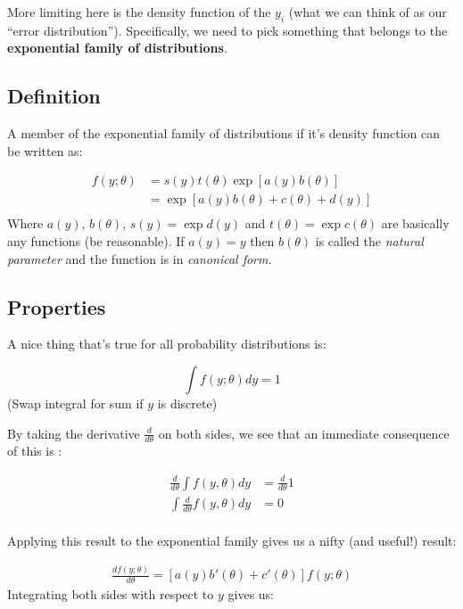\documentclass[
]{article}
\begin{document}
More limiting here is the density function of the \(y_i\) (what we can
think of as our ``error distribution''). Specifically, we need to pick
something that belongs to the \textbf{exponential family of
distributions}.

\hypertarget{definition}{%
\subsection{Definition}\label{definition}}

A member of the exponential family of distributions if it's density
function can be written as:

\[
\begin{split}
f(y;\theta) &= s(y) t(\theta) \exp{ \left[ a(y) b(\theta) \right]}\\
&= \exp{ \left[ a(y) b(\theta) + c(\theta) + d(y)\right]}\\
\end{split}
\] Where \(a(y)\), \(b(\theta)\), \(s(y) = \exp{d(y)}\) and
\(t(\theta) = \exp{c(\theta)}\) are basically any functions (be
reasonable). If \(a(y)=y\) then \(b(\theta)\) is called the
\emph{natural parameter} and the function is in \emph{canonical form}.

\hypertarget{properties}{%
\subsection{Properties}\label{properties}}

A nice thing that's true for all probability distributions is:

\[
\int f(y;\theta) dy = 1
\] (Swap integral for sum if \(y\) is discrete)

By taking the derivative \(\frac{d}{d \theta}\) on both sides, we see
that an immediate consequence of this is :

\[
\begin{split}
\frac{d}{d \theta} \int f(y,\theta) dy &= \frac{d}{d \theta} 1\\
\int \frac{d}{d \theta}  f(y,\theta) dy &= 0 \\
\end{split}
\]

Applying this result to the exponential family gives us a nifty (and
useful!) result:

\[
\begin{split}
\frac{d f(y;\theta)}{d \theta} = [a(y) b'(\theta) + c'(\theta)] f(y;\theta)
\end{split}
\] Integrating both sides with respect to \(y\) gives us:
\end{document}
